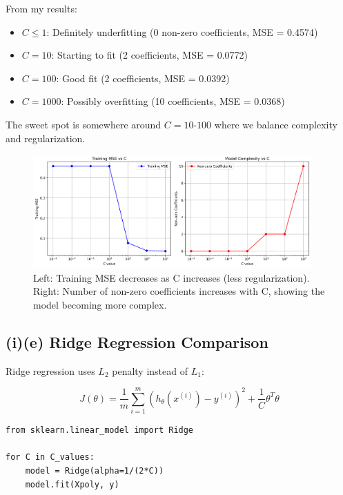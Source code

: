 \documentclass[11pt,a4paper]{article}
\begin{document}
From my results:
\begin{itemize}
    \item $C \leq 1$: Definitely underfitting (0 non-zero coefficients, MSE = 0.4574)
    \item $C = 10$: Starting to fit (2 coefficients, MSE = 0.0772)
    \item $C = 100$: Good fit (2 coefficients, MSE = 0.0392)
    \item $C = 1000$: Possibly overfitting (10 coefficients, MSE = 0.0368)
\end{itemize}

The sweet spot is somewhere around $C = 10$-$100$ where we balance complexity and regularization.

\begin{figure}[H]
\centering
\includegraphics[width=0.95\textwidth]{figures/04_underfitting_overfitting_analysis.png}
\caption{Left: Training MSE decreases as C increases (less regularization). Right: Number of non-zero coefficients increases with C, showing the model becoming more complex.}
\label{fig:underfitting_overfitting}
\end{figure}

\subsection*{(i)(e) Ridge Regression Comparison}

Ridge regression uses $L_2$ penalty instead of $L_1$:

\begin{equation}
J(\theta) = \frac{1}{m} \sum_{i=1}^{m} (h_\theta(x^{(i)}) - y^{(i)})^2 + \frac{1}{C} \theta^T\theta
\end{equation}

\begin{lstlisting}
from sklearn.linear_model import Ridge

for C in C_values:
    model = Ridge(alpha=1/(2*C))
    model.fit(Xpoly, y)
\end{lstlisting}
\end{document}
